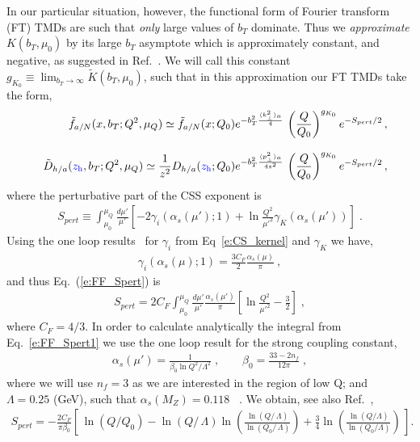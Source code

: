 \documentclass[final,3p,times,onecolumn,sort&compress,hidelinks]{elsarticle}
\newcommand{\zh}{\ensuremath{{\cbl z_{\rm h}}}}
\newcommand\3[1]{\boldsymbol{#1}}
\newcommand{\cbl}{\color{blue}}
\begin{document}
In our particular situation, however, the functional form of Fourier transform (FT) TMDs    are such that {\em only} large values of $b_T$  dominate.  
Thus we {\em approximate} $K(b_T,\mu_0)$ by its large $b_T$ asymptote which is approximately  constant, and  negative,
  as suggested in Ref.~\cite{Collins:2014jpa}.
  We will call this constant $g_{K_{0}}\equiv \lim_{b_T\to \infty} \tilde K(b_T,\mu_0)$, such that in this approximation our FT TMDs take the form,
\begin{eqnarray}
&&\tilde f_{a/N} (x,b_T; Q^2, \mu_Q)\simeq \tilde f_{a/N} (x; Q_0) e^{-b_T^2 \frac{\langle k_\perp^2 \rangle_a}{4}}\,\left( \frac{Q}{Q_0}\right)^{g_{K_0}} e^{-S_{pert}/2}\,,
\nonumber \\[0.3cm]
&&\tilde D_{h/a}(\zh,b_T; Q^2, \mu_Q)\simeq \frac{1}{z^2} D_{h/a}(\zh; Q_0) e^{-b_T^2 \frac{\langle p_\perp^2 \rangle_a}{4 z^2}}\,\left( \frac{Q}{Q_0}\right)^{g_{K_0}}e^{-S_{pert}/2}\,,
\label{e:FF_ansatz1}
\end{eqnarray}
where the  perturbative part of the CSS exponent is
\begin{eqnarray}
S_{pert} \equiv \int_{\mu_0}^{\mu_Q} \frac{d \mu'}{\mu'}\left[
-2 \gamma_i(\alpha_s(\mu');1) +\ln\frac{Q^2}{\mu'^2}\gamma_K(\alpha_s(\mu'))
 \right] \; .
 \label{e:FF_Spert}
\end{eqnarray}
 Using the  one loop results~\cite{Aybat:2011zv} for $\gamma_i$ from Eq~\eqref{e:CS_kernel} and $\gamma_K$  we have,
\begin{eqnarray}
  \gamma_i(\alpha_s(\mu);1) = \frac{3 C_F}{2}  \frac{\alpha_s(\mu)}{\pi}  \ ,
  \end{eqnarray}
and thus Eq.~(\ref{e:FF_Spert}) is
\begin{eqnarray}
S_{pert} = 2 C_F \int_{\mu_0}^{\mu_Q} \frac{d \mu'}{\mu'} \frac{\alpha_s(\mu')}{\pi} \left[\ln\frac{Q^2}{\mu'^2} - \frac{3}{2}
 \right] \; ,
 \label{e:FF_Spert1}
\end{eqnarray}
where $C_F = 4/3$. In order to calculate analytically the integral from Eq.~\eqref{e:FF_Spert1} we   use the one loop result for the strong coupling constant, 
\begin{eqnarray}
\alpha_s(\mu') = \frac{1}{\beta_0 \ln Q^2/\Lambda^2} \; , \quad\quad
\beta_0 = \frac{33-2 n_f}{12 \pi}\; ,
 \label{e:as}
\end{eqnarray}
where we will use $n_f=3$ as we are interested in the region of low Q; and $\Lambda = 0.25$ (GeV), such that $\alpha_s(M_Z)= 0.118$ ~\cite{Bethke:2012jm}. We obtain, see also Ref.~\cite{Aidala:2014hva},
\begin{eqnarray}
    S_{pert} = -\frac{2 C_F}{\pi \beta_0}\left[\, \ln\left(Q/Q_0\right)
  - \ln\left(Q/\, \Lambda\right) \ln\left(\frac{\ln\left(Q/\,\Lambda\right)}
  {\ln\left(Q_0/\, \Lambda\right)}\right) +
\frac{3}{4} \ln \left(\frac{\ln\left(Q/\Lambda\right)}{\ln\left(Q_0/\Lambda\right)} \right)\, \right].
 \label{e:FF_Spert_analytical}
\end{eqnarray}
\end{document}
